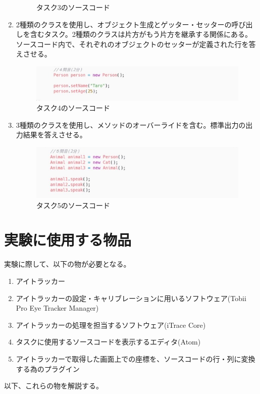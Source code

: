\documentclass[paper=a4paper,fontsize=11pt]{jlreq}
\begin{document}
\begin{enumerate}[label=タスク\arabic*:]
\begin{figure}[h]
        \caption{タスク3のソースコード}
      \end{figure}
      \FloatBarrier
      \item 2種類のクラスを使用し、オブジェクト生成とゲッター・セッターの呼び出しを含むタスク。2種類のクラスは片方がもう片方を継承する関係にある。ソースコード内で、それぞれのオブジェクトのセッターが定義された行を答えさせる。
      \begin{figure}[h]
        \centering
        \includegraphics[height=0.2\linewidth]{プログラム画像_タスク4.jpg}
        \caption{タスク4のソースコード}
      \end{figure}
      \FloatBarrier
      \item 3種類のクラスを使用し、メソッドのオーバーライドを含む。標準出力の出力結果を答えさせる。
      \begin{figure}[h]
        \centering
        \includegraphics[height=0.25\linewidth]{プログラム画像_タスク5.jpg}
        \caption{タスク5のソースコード}
      \end{figure}
      \FloatBarrier
    \end{enumerate}

  

  \section{実験に使用する物品}
    実験に際して、以下の物が必要となる。
    \begin{enumerate}
      \item アイトラッカー
      \item アイトラッカーの設定・キャリブレーションに用いるソフトウェア(Tobii Pro Eye Tracker Manager)
      \item アイトラッカーの処理を担当するソフトウェア(iTrace Core)
      \item タスクに使用するソースコードを表示するエディタ(Atom)
      \item アイトラッカーで取得した画面上での座標を、ソースコードの行・列に変換する為のプラグイン
    \end{enumerate}
    以下、これらの物を解説する。
\end{document}
